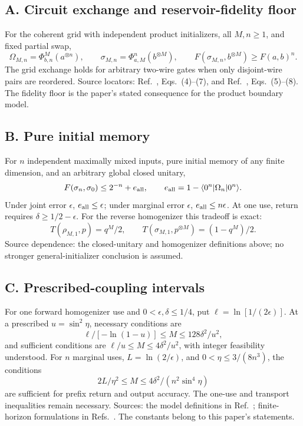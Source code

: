 \documentclass[11pt]{article}
\begin{document}
\par\medskip
\noindent\begin{minipage}{\linewidth}
\subsection*{A. Circuit exchange and reservoir-fidelity floor}
For the coherent grid with independent product initializers, all $M,n\ge1$, and fixed partial swap,
\[
 \Omega_{M,n}=\Phi_{b,n}^{M}(a^{\otimes n}),\qquad
 \sigma_{M,n}=\Phi_{a,M}^{n}(b^{\otimes M}),\qquad
 F(\sigma_{M,n},b^{\otimes M})\ge F(a,b)^n.
\]
The grid exchange holds for arbitrary two-wire gates when only disjoint-wire pairs are reordered. Source locators: Ref.~\cite{gp}, Eqs.~(4)--(7), and Ref.~\cite{cascade}, Eqs.~(5)--(8). The fidelity floor is the paper's stated consequence for the product boundary model.


\end{minipage}
\par\medskip
\noindent\begin{minipage}{\linewidth}
\subsection*{B. Pure initial memory}
For $n$ independent maximally mixed inputs, pure initial memory of any finite dimension, and an arbitrary global closed unitary,
\[
 F(\sigma_n,\sigma_0)\le2^{-n}+e_{\rm all},\qquad
 e_{\rm all}=1-\langle0^n|\Omega_n|0^n\rangle.
\]
Under joint error $\epsilon$, $e_{\rm all}\le\epsilon$; under marginal error $\epsilon$, $e_{\rm all}\le n\epsilon$. At one use, return requires $\delta\ge1/2-\epsilon$. For the reverse homogenizer this tradeoff is exact:
\[
 T(\rho_{M,1},p)=q^M/2,\qquad
 T(\sigma_{M,1},p^{\otimes M})=(1-q^M)/2.
\]
Source dependence: the closed-unitary and homogenizer definitions above; no stronger general-initializer conclusion is assumed.


\end{minipage}
\par\medskip
\noindent\begin{minipage}{\linewidth}
\subsection*{C. Prescribed-coupling intervals}
For one forward homogenizer use and $0<\epsilon,\delta\le1/4$, put $\ell=\ln[1/(2\epsilon)]$. At a prescribed $u=\sin^2\eta$, necessary conditions are
\[
 \ell/[-\ln(1-u)]\le M\le128\delta^2/u^2,
\]
and sufficient conditions are $\ell/u\le M\le4\delta^2/u^2$, with integer feasibility understood. For $n$ marginal uses, $L=\ln(2/\epsilon)$, and $0<\eta\le3/(8n^3)$, the conditions
\[
 2L/\eta^2\le M\le4\delta^2/(n^2\sin^4\eta)
\]
are sufficient for prefix return and output accuracy. The one-use and transport inequalities remain necessary. Sources: the model definitions in Ref.~\cite{ziman}; finite-horizon formulations in Refs.~\cite{vm,beever}. The constants belong to this paper's statements.


\end{minipage}
\end{document}
